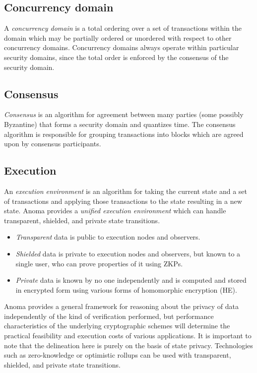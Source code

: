 \documentclass[
    9pt,            %
    commun,        %
    affiltop,       %
]{art}
\begin{document}
\subsection{Concurrency domain}\label{concurrency-domain}

A \emph{concurrency domain} is a total ordering over a set of
transactions within the domain which may be partially ordered or
unordered with respect to other concurrency domains. Concurrency domains
always operate within particular security domains, since the total order
is enforced by the consensus of the security domain.

\subsection{Consensus}\label{consensus}

\emph{Consensus} is an algorithm for agreement between many parties
(some possibly Byzantine) that forms a security domain and quantizes
time. The consensus algorithm is responsible for grouping transactions
into blocks which are agreed upon by consensus participants.

\subsection{Execution}\label{execution}

An \emph{execution environment} is an algorithm for taking the current
state and a set of transactions and applying those transactions to the
state resulting in a new state. Anoma provides a \emph{unified execution
environment} which can handle transparent, shielded, and private state
transitions.

\begin{itemize}

\item
  \emph{Transparent} data is public to execution nodes and observers.
\item
  \emph{Shielded} data is private to execution nodes and observers, but
  known to a single user, who can prove properties of it using ZKPs.
\item
  \emph{Private} data is known by no one independently and is computed
  and stored in encrypted form using various forms of homomorphic
  encryption (HE).
\end{itemize}

Anoma provides a general framework for reasoning about the privacy of
data independently of the kind of verification performed, but
performance characteristics of the underlying cryptographic schemes will
determine the practical feasibility and execution costs of various
applications. It is important to note that the delineation here is
purely on the basis of state privacy. Technologies such as
zero-knowledge or optimistic rollups can be used with transparent,
shielded, and private state transitions.
\end{document}
